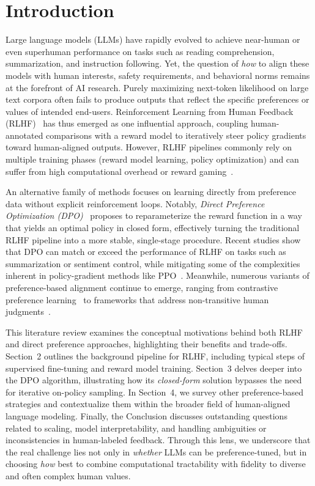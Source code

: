 \documentclass[a4paper,oneside,10pt,ngerman,english]{scrartcl}
\begin{document}
\cleardoubleoddpage

\section{Introduction}
\label{sec:introduction}

Large language models (LLMs) have rapidly evolved to achieve near-human or even superhuman
performance on tasks such as reading comprehension, summarization, and instruction following. Yet,
the question of \emph{how} to align these models with human interests, safety requirements, and
behavioral norms remains at the forefront of AI research. Purely maximizing next-token likelihood
on large text corpora often fails to produce outputs that reflect the specific preferences or values
of intended end-users. Reinforcement Learning from Human Feedback (RLHF)~\cite{bib:Christiano2017}
has thus emerged as one influential approach, coupling human-annotated comparisons with a reward
model to iteratively steer policy gradients toward human-aligned outputs. However, RLHF pipelines
commonly rely on multiple training phases (reward model learning, policy optimization) and can
suffer from high computational overhead or reward gaming~\cite{bib:Gao2023}.

An alternative family of methods focuses on learning directly from preference data without explicit
reinforcement loops. Notably, \emph{Direct Preference Optimization (DPO)}~\cite{bib:Rafailov2023}
proposes to reparameterize the reward function in a way that yields an optimal policy in closed form,
effectively turning the traditional RLHF pipeline into a more stable, single-stage procedure. Recent
studies show that DPO can match or exceed the performance of RLHF on tasks such as summarization
or sentiment control, while mitigating some of the complexities inherent in policy-gradient methods
like PPO~\cite{bib:Schulman2017}. Meanwhile, numerous variants of preference-based alignment
continue to emerge, ranging from contrastive preference learning~\cite{bib:Zhao2023} to frameworks
that address non-transitive human judgments~\cite{bib:Tversky1969}.

This literature review examines the conceptual motivations behind both RLHF and direct preference
approaches, highlighting their benefits and trade-offs. Section~2 outlines the background pipeline
for RLHF, including typical steps of supervised fine-tuning and reward model training. Section~3
delves deeper into the DPO algorithm, illustrating how its \emph{closed-form} solution bypasses the
need for iterative on-policy sampling. In Section~4, we survey other preference-based strategies and
contextualize them within the broader field of human-aligned language modeling. Finally, the
Conclusion discusses outstanding questions related to scaling, model interpretability, and handling
ambiguities or inconsistencies in human-labeled feedback. Through this lens, we underscore that the
real challenge lies not only in \emph{whether} LLMs can be preference-tuned, but in choosing \emph{how}
best to combine computational tractability with fidelity to diverse and often complex human values.
\end{document}
